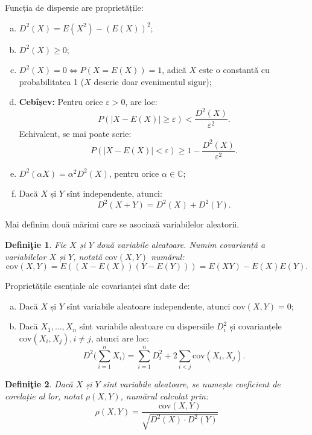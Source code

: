 \documentclass[12pt,a4paper]{article}
\newcommand\CC{\mathbb{C}}
\theoremstyle{dotless}
\theoremstyle{dotlessdr}
\newtheorem{definition}{Defini\c{t}ie}
\begin{document}
Funcția de dispersie are proprietățile:
\begin{enumerate}[(a)]
\item $ D^2(X) = E(X^2) - (E(X))^2 $;
\item $ D^2(X) \geq 0 $;
\item $ D^2(X) = 0 \Leftrightarrow P(X = E(X)) = 1 $, adică $ X $ este o constantă cu
  probabilitatea 1 ($ X $ descrie doar evenimentul sigur);
\item \textbf{Cebîșev:} Pentru orice $ \varepsilon > 0 $, are loc:
  \[
    P(|X - E(X)| \geq \varepsilon) < \frac{D^2(X)}{\varepsilon^2}. 
  \]
  Echivalent, se mai poate scrie:
  \[
    P(|X - E(X)| < \varepsilon) \geq 1 - \frac{D^2(X)}{\varepsilon^2}.
  \]
\item $ D^2(\alpha X) = \alpha^2 D^2(X) $, pentru orice $ \alpha \in \CC $;
\item Dacă $ X $ și $ Y $ sînt independente, atunci:
  \[
    D^2(X + Y) = D^2(X) + D^2(Y).
  \]
\end{enumerate}

Mai definim două mărimi care se asociază variabilelor aleatorii.

\begin{definition}\label{def:cov}
  Fie $ X $ și $ Y $ două variabile aleatoare. Numim \emph{covarianță} a
  variabilelor $ X $ și $ Y $, notată $ \mathrm{cov}(X, Y) $ numărul:
  \[
    \mathrm{cov}(X, Y) = E((X - E(X))(Y - E(Y))) = E(XY) - E(X)E(Y).
  \]
\end{definition}

Proprietățile esențiale ale covarianței sînt date de:
\begin{enumerate}[(a)]
\item Dacă $ X $ și $ Y $ sînt variabile aleatoare independente, atunci
  $ \mathrm{cov}(X, Y) = 0 $;
\item Dacă $ X_1, \dots, X_n $ sînt variabile aleatoare cu dispersiile
  $ D_i^2 $ și covarianțele $ \mathrm{cov}(X_i, X_j), i \neq j $, atunci are loc:
  \[
    D^2\Big( \sum_{i = 1}^n X_i \Big) = \sum_{i = 1}^n D_i^2 + %
    2 \sum_{i < j} \mathrm{cov}(X_i, X_j).
  \]
\end{enumerate}

\begin{definition}\label{def:cor}
  Dacă $ X $ și $ Y $ sînt variabile aleatoare, se numește \emph{coeficient de corelație}
  al lor, notat $ \rho(X, Y) $, numărul calculat prin:
  \[
    \rho(X, Y) = \frac{\mathrm{cov}(X, Y)}{\sqrt{D^2(X) \cdot D^2(Y)}}
  \]
\end{definition}
\end{document}
